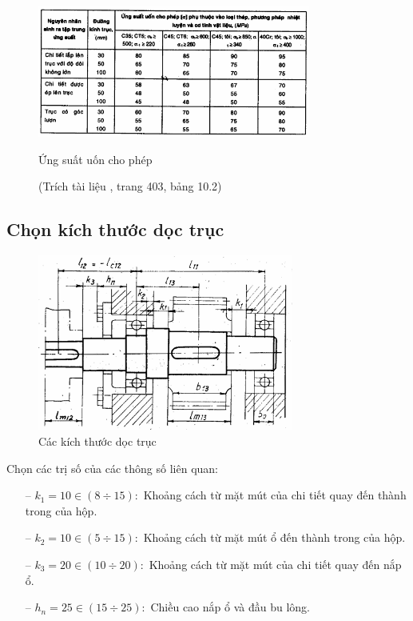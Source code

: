             \begin{figure}[H]
                \centering
                \includegraphics[width=0.8\textwidth]{pictures/bending_stress.png}
                \caption{Ứng suất uốn cho phép}
                \caption*{\footnotesize (Trích tài liệu \cite{gtctm}, trang 403, bảng 10.2)}
            \end{figure}
        \subsection{Chọn kích thước dọc trục}
            \begin{figure}[H]
                \centering
                \includegraphics[width=0.75\textwidth]{pictures/shaft.png}
                \caption{Các kích thước dọc trục}
                \label{fig:shaft_standard}
            \end{figure} 
            \hspace*{0.6cm}Chọn các trị số của các thông số liên quan:
            \begin{itemize}
                \item [--] $k_1 = 10 \in (8 \div 15): $ Khoảng cách từ mặt mút của chi tiết quay đến thành trong của hộp.
                \item [--] $k_2 = 10 \in (5 \div 15): $ Khoảng cách từ mặt mút ổ đến thành trong của hộp.
                \item [--] $k_3 = 20 \in (10 \div 20): $ Khoảng cách từ mặt mút của chi tiết quay đến nắp ổ.
                \item [--] $h_n = 25 \in (15 \div 25): $ Chiều cao nắp ổ và đầu bu lông.
            \end{itemize}
